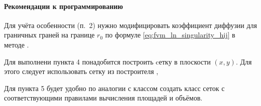 \paragraph{Рекомендации к программированию}
Для учёта особенности (п.~2) нужно модифицировать
коэффициент диффузии для граничных граней на границе $r_0$
по формуле \cref{eq:fvm_ln_singularity_hij} в методе .

Для выполнени пункта 4 понадобится построить cетку в плоскости $(x, y)$. 
Для этого следует использовать сетку из построителя ,

Для пункта 5 будет удобно по аналогии с классом 
создать класс сеток  с соответствующими правилами вычисления площадей и объёмов.
